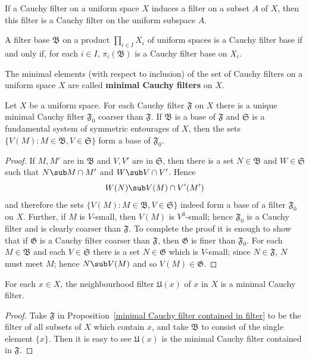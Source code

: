 \begin{corollary}
If a Cauchy filter on a uniform space $X$ induces a filter on a subset $A$ of $X$, then this filter is a Cauchy filter on the uniform subspace $A$.
\end{corollary}
\begin{corollary}\label{filter Cauchy product space iff}
A filter base $\mathfrak{B}$ on a product $\prod_{i\in I}X_i$ of uniform spaces is a Cauchy filter base if and only if, for each $i\in I$, $\pi_i(\mathfrak{B})$ is a Cauchy filter base on $X_i$.
\end{corollary}
The minimal elements (with respect to inclusion) of the set of Cauchy filters on a uniform space $X$ are called \textbf{minimal Cauchy filters} on $X$.
\begin{proposition}\label{minimal Cauchy filter contained in filter}
Let $X$ be a uniform space. For each Cauchy filter $\mathfrak{F}$ on $X$ there is a unique minimal Cauchy filter $\mathfrak{F}_0$ coarser than $\mathfrak{F}$. If $\mathfrak{B}$ is a base of $\mathfrak{F}$ and $\mathfrak{S}$ is a fundamental system of symmetric entourages of $X$, then the sets $\{V(M):M\in\mathfrak{B},V\in\mathfrak{S}\}$ form a base of $\mathfrak{F}_0$.
\end{proposition}
\begin{proof}
If $M,M'$ are in $\mathfrak{B}$ and $V,V'$ are in $\mathfrak{S}$, then there is a set $N\in\mathfrak{B}$ and $W\in\mathfrak{S}$ such that $N\sub M\cap M'$ and $W\sub V\cap V'$. Hence
\[W(N)\sub V(M)\cap V'(M')\]
and therefore the sets $\{V(M):M\in\mathfrak{B},V\in\mathfrak{S}\}$ indeed form a base of a filter $\mathfrak{F}_0$ on $X$. Further, if $M$ is $V$-small, then $V(M)$ is $V^3$-small; hence $\mathfrak{F}_0$ is a Cauchy filter and is clearly coarser than $\mathfrak{F}$. To complete the proof it is enough to show that if $\mathfrak{G}$ is a Cauchy filter coarser than $\mathfrak{F}$, then $\mathfrak{G}$ is finer than $\mathfrak{F}_0$. For each $M\in\mathfrak{B}$ and each $V\in\mathfrak{S}$ there is a set $N\in\mathfrak{G}$ which is $V$-small; since $N\in\mathfrak{F}$, $N$ must meet $M$; hence $N\sub V(M)$ and so $V(M)\in\mathfrak{G}$.
\end{proof}
\begin{corollary}\label{filter nbdh is minimal}
For each $x\in X$, the neighbourhood filter $\mathfrak{U}(x)$ of $x$ in $X$ is a minimal Cauchy filter.
\end{corollary}
\begin{proof}
Take $\mathfrak{F}$ in Proposition~\ref{minimal Cauchy filter contained in filter} to be the filter of all subsets of $X$ which contain $x$, and take $\mathfrak{B}$ to consist of the single element $\{x\}$. Then it is easy to see $\mathfrak{U}(x)$ is the minimal Cauchy filter contained in $\mathfrak{F}$.
\end{proof}
